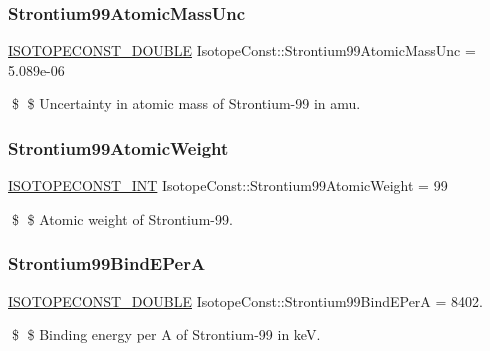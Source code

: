 \subsubsection{\texorpdfstring{Strontium99\+Atomic\+Mass\+Unc}{Strontium99AtomicMassUnc}}
{\footnotesize\ttfamily \mbox{\hyperlink{group___isotope_const-_macros_ga8f45a7272ce02c0b4c65c44636ed719a}{I\+S\+O\+T\+O\+P\+E\+C\+O\+N\+S\+T\+\_\+\+D\+O\+U\+B\+LE}} Isotope\+Const\+::\+Strontium99\+Atomic\+Mass\+Unc = 5.\+089e-\/06}

\$ \$ Uncertainty in atomic mass of Strontium-\/99 in amu. \mbox{\label{group___isotope_const-_strontium-_sr99_ga7dd2faa4528577e832e9e8a42e04d9eb}} 
\subsubsection{\texorpdfstring{Strontium99\+Atomic\+Weight}{Strontium99AtomicWeight}}
{\footnotesize\ttfamily \mbox{\hyperlink{group___isotope_const-_macros_ga5f18360b3e99483a35c32d789e62621c}{I\+S\+O\+T\+O\+P\+E\+C\+O\+N\+S\+T\+\_\+\+I\+NT}} Isotope\+Const\+::\+Strontium99\+Atomic\+Weight = 99}

\$ \$ Atomic weight of Strontium-\/99. \mbox{\label{group___isotope_const-_strontium-_sr99_ga1795324734f2225df7ef7b45bd439bc2}} 
\subsubsection{\texorpdfstring{Strontium99\+Bind\+E\+PerA}{Strontium99BindEPerA}}
{\footnotesize\ttfamily \mbox{\hyperlink{group___isotope_const-_macros_ga8f45a7272ce02c0b4c65c44636ed719a}{I\+S\+O\+T\+O\+P\+E\+C\+O\+N\+S\+T\+\_\+\+D\+O\+U\+B\+LE}} Isotope\+Const\+::\+Strontium99\+Bind\+E\+PerA = 8402.}

\$ \$ Binding energy per A of Strontium-\/99 in keV. \mbox{\label{group___isotope_const-_strontium-_sr99_gaf5f25464d37db41da7bcbe2ce62157e4}} 
